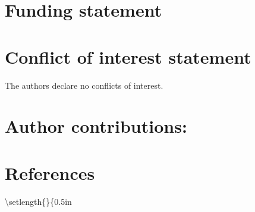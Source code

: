 \documentclass[
  american,
  ,man,floatsintext]{apa6}
\begin{document}
\hypertarget{funding-statement}{%
\section{Funding statement}\label{funding-statement}}

\hypertarget{conflict-of-interest-statement}{%
\section{Conflict of interest statement}\label{conflict-of-interest-statement}}

The authors declare no conflicts of interest.

\hypertarget{author-contributions}{%
\section{Author contributions:}\label{author-contributions}}

\newpage

\hypertarget{references}{%
\section{References}\label{references}}

\setlength{\parindent}{-0.5in}

\textbackslash setlength\{\leftskip\}\{0.5in

\clearpage
\makeatletter
\efloat@restorefloats
\makeatother
\end{document}
